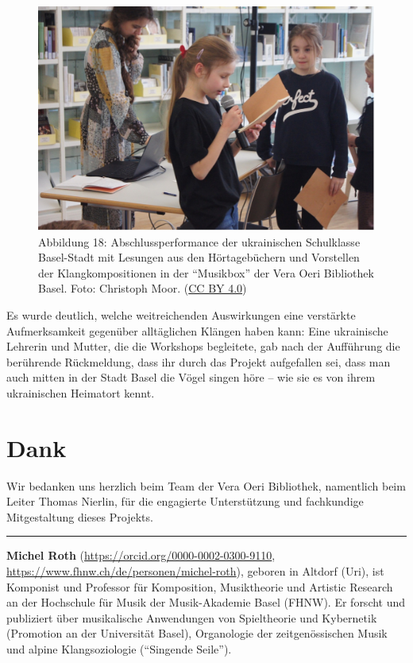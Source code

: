 \documentclass[a4paper,
fontsize=11pt,
oneside,
numbers=noperiodatend,
parskip=half-,
bibliography=totoc,
final
]{scrartcl}
\begin{document}
\begin{figure}
\centering
\includegraphics{img/Abb18.jpg}
\caption{Abbildung 18: Abschlussperformance der ukrainischen Schulklasse Basel-Stadt
mit Lesungen aus den Hörtagebüchern und Vorstellen der
Klangkompositionen in der \enquote{Musikbox} der Vera Oeri Bibliothek
Basel. Foto: Christoph Moor. (\href{https://creativecommons.org/licenses/by/4.0/}{CC BY 4.0})}
\end{figure}

Es wurde deutlich, welche weitreichenden Auswirkungen eine verstärkte
Aufmerksamkeit gegenüber alltäglichen Klängen haben kann: Eine
ukrainische Lehrerin und Mutter, die die Workshops begleitete, gab nach
der Aufführung die berührende Rückmeldung, dass ihr durch das Projekt
aufgefallen sei, dass man auch mitten in der Stadt Basel die Vögel
singen höre -- wie sie es von ihrem ukrainischen Heimatort kennt.


\hypertarget{dankt}{%
\section{Dank}\label{dank}}

Wir bedanken uns herzlich beim Team der Vera Oeri Bibliothek, namentlich
beim Leiter Thomas Nierlin, für die engagierte Unterstützung und
fachkundige Mitgestaltung dieses Projekts.

\begin{center}\rule{0.5\linewidth}{0.5pt}\end{center}

\textbf{Michel Roth} (\url{https://orcid.org/0000-0002-0300-9110},
\url{https://www.fhnw.ch/de/personen/michel-roth}), geboren in Altdorf
(Uri), ist Komponist und Professor für Komposition, Musiktheorie und
Artistic Research an der Hochschule für Musik der Musik-Akademie Basel
(FHNW). Er forscht und publiziert über musikalische Anwendungen von
Spieltheorie und Kybernetik (Promotion an der Universität Basel),
Organologie der zeitgenössischen Musik und alpine Klangsoziologie
(``Singende Seile'').
\end{document}
